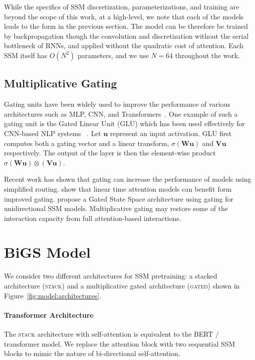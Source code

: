 While the specifics of SSM discretization, parameterizations, and training are beyond the scope of this work, at a high-level, we note that each of the models leads to the form in the previous section. The model can be therefore be trained by backpropagation though the convolution and discretization without the serial bottleneck of RNNs, and applied without the quadratic cost of attention. Each SSM itself has $O(N^2) $ parameters, and we use $N=64$ throughout the work. 

\subsection{Multiplicative Gating} Gating units have been widely used to improve the performance of various architectures such as MLP, CNN, and Transformers~\citep{dauphin2017language, shazeer2020glu, narang2021transformer}.  One example of such a gating unit is the Gated Linear Unit (GLU) which has been used effectively for CNN-based NLP systems ~\cite{dauphin2017language}. Let $\mathbf{u}$ represent an input activation. GLU first computes both a gating vector and a linear transform, $\sigma(\mathbf{W} \mathbf{u})$ and $\mathbf{V} \mathbf{u}$ respectively. The output of the layer is then the element-wise product 
$\sigma(\mathbf{W} \mathbf{u}) \otimes (\mathbf{V} \mathbf{u})$.

Recent work has shown that gating can increase the performance of models using simplified routing. \citet{hua2022transformer} show that linear time attention models can benefit form improved gating. \citet{mehta2022long} propose a Gated State Space architecture using gating for unidirectional SSM models. Multiplicative gating may restore some of the interaction capacity from full attention-based interactions.

\section{BiGS Model}

We consider two different architectures for SSM pretraining: a stacked architecture (\textsc{stack}) and a multiplicative gated architecture (\textsc{gated}) shown in Figure~\ref{fig:model:architectures}. 

\paragraph{Transformer Architecture }

The \textsc{stack} architecture with self-attention is equivalent to the BERT / transformer model. We replace the attention block with two sequential SSM blocks to mimic the nature of bi-directional self-attention. 

